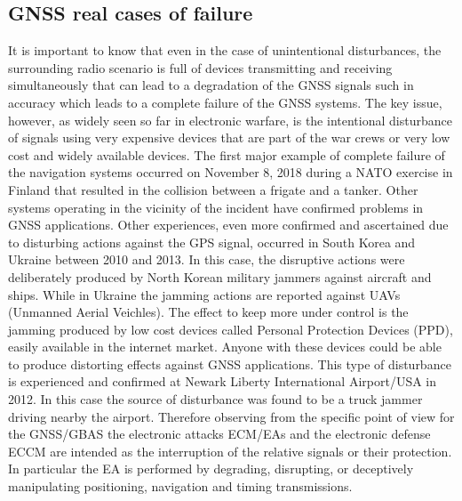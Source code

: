 \documentclass[12pt]{report}
\begin{document}
\subsection{GNSS real cases of failure}
It is important to know that even in the case of unintentional disturbances, the surrounding radio scenario is full of devices transmitting and receiving simultaneously that can lead to a degradation of the GNSS signals such in accuracy which leads to a complete failure of the GNSS systems. The key issue, however, as widely seen so far in electronic warfare, is the intentional disturbance of signals using very expensive devices that are part of the war crews or very low cost and widely available devices. The first major example of complete failure of the navigation systems occurred on November 8, 2018 during a NATO exercise in Finland that resulted in the collision between a frigate and a tanker. Other systems operating in the vicinity of the incident have confirmed problems in GNSS applications. Other experiences, even more confirmed and ascertained due to disturbing actions against the GPS signal, occurred in South Korea and Ukraine between 2010 and 2013. In this case, the disruptive actions were deliberately produced by North Korean military jammers against aircraft and ships. While in Ukraine the jamming actions are reported against UAVs (Unmanned Aerial Veichles). The effect to keep more under control is the jamming produced by low cost devices called Personal Protection Devices (PPD), easily available in the internet market. Anyone with these devices could be able to produce distorting effects against GNSS applications. This type of disturbance is experienced and confirmed at Newark Liberty International Airport/USA in 2012. In this case the source of disturbance was found to be a truck jammer driving nearby the airport. Therefore observing from the specific point of view for the GNSS/GBAS the electronic attacks ECM/EAs and the electronic defense ECCM are intended as the interruption of the relative signals or their protection. In particular the EA is performed by degrading, disrupting, or deceptively manipulating positioning, navigation and timing transmissions.
\end{document}
